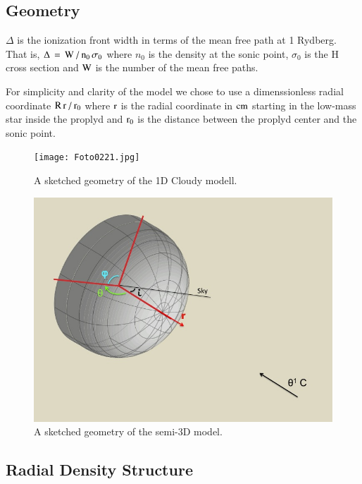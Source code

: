 \documentclass[aaspp]{article}
\begin{document}
\subsection{Geometry}
\label{sec:geometry}

$\Delta$ is the ionization front width in terms of the mean free path
at 1 Rydberg. That is, $\rm \Delta \, = \, W \, / \, n_0 \,
\sigma_0$ where $n_0$ is the density at the sonic point, $\sigma_0$
is the H cross section and $\rm W$ is the number of the mean free
paths.

For simplicity and clarity of the model we chose to use a
dimenssionless radial coordinate $\rm R \, r\,/\,r_0$ where $\rm r$ is
the radial coordinate in $\rm cm$ starting in the low-mass star inside
the proplyd and $\rm r_0$ is the distance between the proplyd center
and the sonic point.

\begin{figure}[h]
\centering
  \texttt{[image: Foto0221.jpg]}
  \caption{A sketched geometry of the 1D Cloudy modell.} \label{fig:1Dgeom}
\end{figure}

\begin{figure}[h]
  \centering
  \includegraphics[width=8.5 cm]{./graf_model_3D/geometry_model.jpg}
  \caption{A sketched geometry of the semi-3D model.} \label{fig:3Dgeom}
\end{figure}



\subsection{Radial Density Structure}
\label{sec:density}
\end{document}
